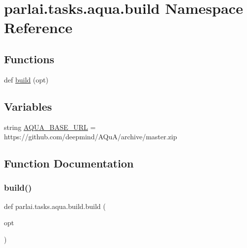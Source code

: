 \hypertarget{namespaceparlai_1_1tasks_1_1aqua_1_1build}{}\section{parlai.\+tasks.\+aqua.\+build Namespace Reference}
\label{namespaceparlai_1_1tasks_1_1aqua_1_1build}
\subsection*{Functions}
\begin{DoxyCompactItemize}
\item 
def \hyperlink{namespaceparlai_1_1tasks_1_1aqua_1_1build_a6b4f6ce85b0fc6e988403a0def089b5a}{build} (opt)
\end{DoxyCompactItemize}
\subsection*{Variables}
\begin{DoxyCompactItemize}
\item 
string \hyperlink{namespaceparlai_1_1tasks_1_1aqua_1_1build_a884df828442b362b4f66e6416152f2cf}{A\+Q\+U\+A\+\_\+\+B\+A\+S\+E\+\_\+\+U\+RL} = \textquotesingle{}https\+://github.\+com/deepmind/A\+QuA/archive/master.\+zip\textquotesingle{}
\end{DoxyCompactItemize}


\subsection{Function Documentation}
\mbox{\label{namespaceparlai_1_1tasks_1_1aqua_1_1build_a6b4f6ce85b0fc6e988403a0def089b5a}} 
\subsubsection{\texorpdfstring{build()}{build()}}
{\footnotesize\ttfamily def parlai.\+tasks.\+aqua.\+build.\+build (\begin{DoxyParamCaption}\item[{}]{opt }\end{DoxyParamCaption})}



